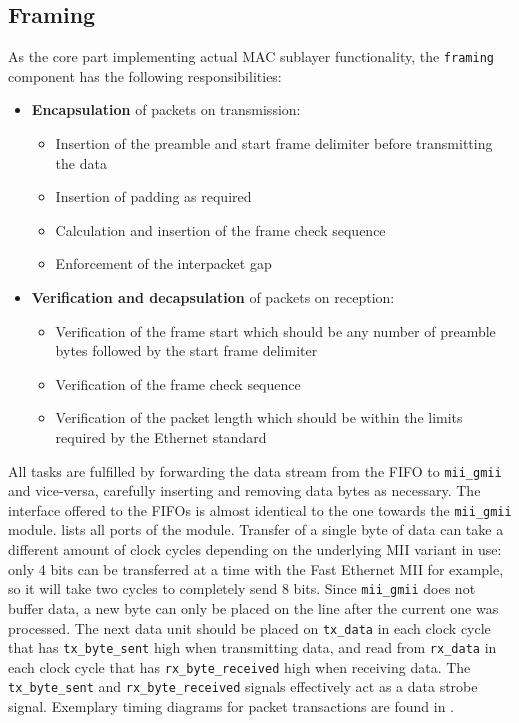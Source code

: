 \documentclass[a4paper, 11pt, oneside]{Thesis}  %
\begin{document}
\subsection{Framing}\label{ch:framing}

As the core part implementing actual MAC sublayer functionality, the \texttt{framing} component has the following responsibilities:

\begin{itemize}
\item \textbf{Encapsulation} of packets on transmission:
\begin{itemize}
\item Insertion of the preamble and start frame delimiter before transmitting the data
\item Insertion of padding as required
\item Calculation and insertion of the frame check sequence
\item Enforcement of the interpacket gap
\end{itemize}
\item \textbf{Verification and decapsulation} of packets on reception:
\begin{itemize}
\item Verification of the frame start which should be any number of preamble bytes followed by the start frame delimiter
\item Verification of the frame check sequence
\item Verification of the packet length which should be within the limits required by the Ethernet standard
\end{itemize}
\end{itemize}

All tasks are fulfilled by forwarding the data stream from the FIFO to \texttt{mii\_gmii} and vice-versa, carefully inserting and removing data bytes as necessary. The interface offered to the FIFOs is almost identical to the one towards the \texttt{mii\_gmii} module.  lists all ports of the module. Transfer of a single byte of data can take a different amount of clock cycles depending on the underlying MII variant in use: only 4 bits can be transferred at a time with the Fast Ethernet MII for example, so it will take two cycles to completely send 8 bits. Since \texttt{mii\_gmii} does not buffer data, a new byte can only be placed on the line after the current one was processed. The next data unit should be placed on \texttt{tx\_data} in each clock cycle that has \texttt{tx\_byte\_sent} high when transmitting data, and read from \texttt{rx\_data} in each clock cycle that has \texttt{rx\_byte\_received} high when receiving data. The \texttt{tx\_byte\_sent} and \texttt{rx\_byte\_received} signals effectively act as a data strobe signal. Exemplary timing diagrams for packet transactions are found in .
\end{document}
